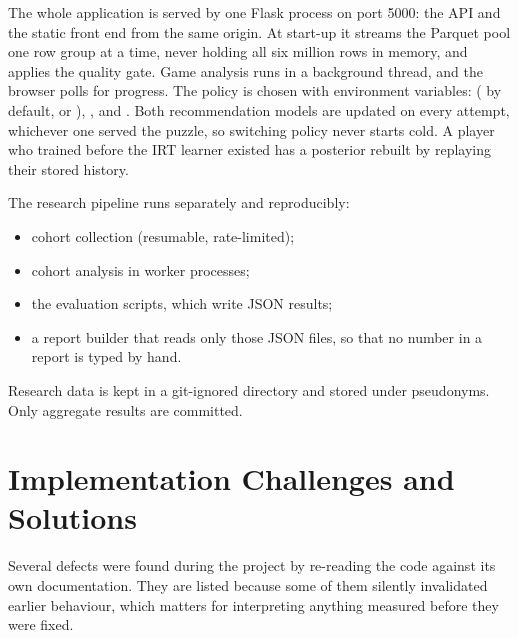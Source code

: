 The whole application is served by one Flask process on port 5000: the API and the static front end
from the same origin. At start-up it streams the Parquet pool one row group at a time, never holding
all six million rows in memory, and applies the quality gate. Game analysis runs in a background
thread, and the browser polls for progress. The policy is chosen with environment variables:
 ( by default, or ), , and
. Both recommendation models are updated on every attempt, whichever one served
the puzzle, so switching policy never starts cold. A player who trained before the IRT learner
existed has a posterior rebuilt by replaying their stored history.

The research pipeline runs separately and reproducibly:
\begin{itemize}
  \item cohort collection (resumable, rate-limited);
  \item cohort analysis in worker processes;
  \item the evaluation scripts, which write JSON results;
  \item a report builder that reads only those JSON files, so that no number in a report is typed by
        hand.
\end{itemize}
Research data is kept in a git-ignored directory and stored under pseudonyms. Only aggregate results
are committed.

\section{Implementation Challenges and Solutions}\label{sec:challenges}

Several defects were found during the project by re-reading the code against its own documentation.
They are listed because some of them silently invalidated earlier behaviour, which matters for
interpreting anything measured before they were fixed.

